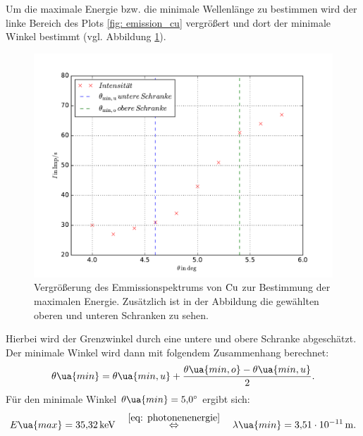 Um die maximale Energie bzw. die minimale Wellenlänge zu bestimmen wird der linke
Bereich des Plots \ref{fig: emission_cu} vergrößert und dort der minimale Winkel bestimmt (vgl. Abbildung \ref{fig: emission_cu_max_energie}).
\begin{figure}
  \centering
  \includegraphics[width=1 \textwidth]{../Messdaten/emission_cu_maximale_energies.pdf}
  \caption{Vergrößerung des Emmissionspektrums von $\ce{Cu}$ zur Bestimmung der maximalen Energie. Zusätzlich ist in der Abbildung die gewählten oberen und unteren Schranken zu sehen.}
  \label{fig: emission_cu_max_energie}
\end{figure}
Hierbei wird der Grenzwinkel durch eine untere und obere Schranke abgeschätzt.
Der minimale Winkel wird dann mit folgendem Zusammenhang berechnet:
\begin{equation*}
  \theta\ua{min}=\theta\ua{min,u}+\frac{\theta\ua{min,o}-\theta\ua{min,u}}{2}.
\end{equation*}
Für den minimale Winkel $\theta\ua{min}=\SI{5.0}{\degree}$ ergibt sich:
\begin{equation}
  \label{eq: maximale_energie}
  E\ua{max}=\SI{35.32}{\kilo\eV} \quad \overset{\eqref{eq: photonenenergie}}{\Leftrightarrow} \quad \lambda\ua{min}=\SI{3.51e-11}{\meter}.
\end{equation}

